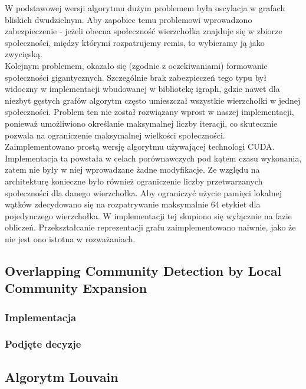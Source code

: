 \documentclass{article}
\begin{document}
W podstawowej wersji algorytmu dużym problemem była oscylacja w grafach bliskich dwudzielnym. Aby zapobiec temu problemowi wprowadzono zabezpieczenie - jeżeli obecna społeczność wierzchołka znajduje się w zbiorze społeczności, między którymi rozpatrujemy remis, to wybieramy ją jako zwycięską.\\

Kolejnym problemem, okazało się (zgodnie z oczekiwaniami) formowanie społeczności gigantycznych. Szczególnie brak zabezpieczeń tego typu był widoczny w implementacji wbudowanej w bibliotekę igraph, gdzie nawet dla niezbyt gęstych grafów algorytm często umieszczał wszystkie wierzchołki w jednej społeczności. Problem ten nie został rozwiązany wprost w naszej implementacji, ponieważ umożliwiono określanie maksymalnej liczby iteracji, co skutecznie pozwala na ograniczenie maksymalnej wielkości społeczności.\\

Zaimplementowano prostą wersję algorytmu używającej technologi CUDA. Implementacja ta powstała w celach porównawczych pod kątem czasu wykonania, zatem nie były w niej wprowadzane żadne modyfikacje. Ze względu na architekturę konieczne było również ograniczenie liczby przetwarzanych społeczności dla danego wierzchołka. Aby ograniczyć użycie pamięci lokalnej wątków zdecydowano się na rozpatrywanie maksymalnie 64 etykiet dla pojedynczego wierzchołka. W implementacji tej skupiono się wyłącznie na fazie obliczeń. Przekształcanie reprezentacji grafu zaimplementowano naiwnie, jako że nie jest ono istotna w rozważaniach.

\subsection{Overlapping Community Detection by Local Community Expansion}
\subsubsection{Implementacja}
\subsubsection{Podjęte decyzje}

\subsection{Algorytm Louvain}
\end{document}
